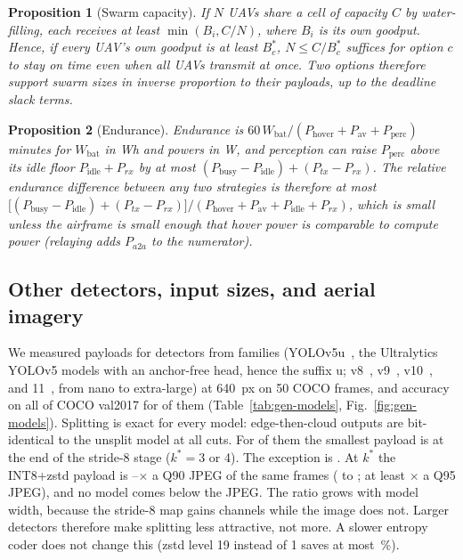 \documentclass[journal,twocolumn,10pt]{IEEEtran}
\newtheorem{proposition}{Proposition}
\newcommand{\figref}[1]{Fig.~\ref{#1}}
\begin{document}
\begin{proposition}[Swarm capacity]\label{prop:swarm}
If $N$ UAVs share a cell of capacity $C$ by water-filling, each receives at least $\min(B_i,C/N)$, where $B_i$ is its own goodput. Hence, if every UAV's own goodput is at least $B^\ast_c$, $N\le C/B^\ast_c$ suffices for option $c$ to stay on time even when all UAVs transmit at once. Two options therefore support swarm sizes in inverse proportion to their payloads, up to the deadline slack terms.
\end{proposition}

\begin{proposition}[Endurance]\label{prop:energy}
Endurance is $60\,W_{\mathrm{bat}}/(P_{\mathrm{hover}}+P_{\mathrm{av}}+P_{\mathrm{perc}})$ minutes for $W_{\mathrm{bat}}$ in Wh and powers in W, and perception can raise $P_{\mathrm{perc}}$ above its idle floor $P_{\mathrm{idle}}+P_{rx}$ by at most $(P_{\mathrm{busy}}-P_{\mathrm{idle}})+(P_{tx}-P_{rx})$. The relative endurance difference between any two strategies is therefore at most $\big[(P_{\mathrm{busy}}-P_{\mathrm{idle}})+(P_{tx}-P_{rx})\big]/(P_{\mathrm{hover}}+P_{\mathrm{av}}+P_{\mathrm{idle}}+P_{rx})$, which is small unless the airframe is small enough that hover power is comparable to compute power (relaying adds $P_{a2a}$ to the numerator).
\end{proposition}

\subsection{Other detectors, input sizes, and aerial imagery}\label{sec:gen-models}
We measured payloads for \GenNModels{} detectors from \GenNFamilies{} families (YOLOv5u~\cite{jocher2020yolov5}, the Ultralytics YOLOv5 models with an anchor-free head, hence the suffix u; v8~\cite{jocher2023yolo}, v9~\cite{wang2024yolov9}, v10~\cite{wang2024yolov10}, and 11~\cite{jocher2024yolo11}, from nano to extra-large) at 640~px on 50 COCO frames, and accuracy on all of COCO val2017 for \GenNAccModels{} of them (Table~\ref{tab:gen-models}, \figref{fig:gen-models}). Splitting is exact for every model: edge-then-cloud outputs are bit-identical to the unsplit model at all \GenTotalCutsChecked{} cuts. For \GenNStrideEightBottleneck{} of them the smallest payload is at the end of the stride-8 stage ($k^\ast=3$ or 4). The exception is \GenOddBottleneck. At $k^\ast$ the INT8+zstd payload is \GenRatioMin--\GenRatioMax$\times$ a Q90 JPEG of the same frames (\GenRatioMinModel{} to \GenRatioMaxModel{}; at least \GenRatioNinetyFiveMin$\times$ a Q95 JPEG), and no model comes below the JPEG. The ratio grows with model width, because the stride-8 map gains channels while the image does not. Larger detectors therefore make splitting less attractive, not more. A slower entropy coder does not change this (zstd level 19 instead of 1 saves at most \GenZstdNineteenGainMax\,\%).
\end{document}
